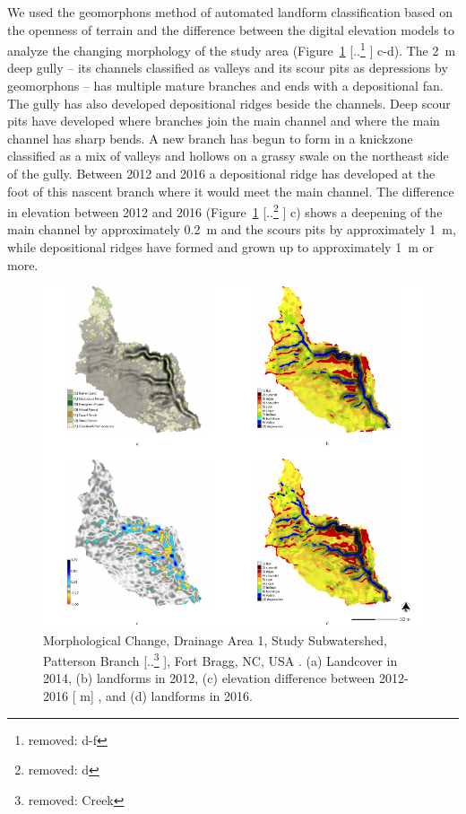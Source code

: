 \documentclass[gmd, manuscript]{copernicus}
\providecommand{\DIFadd}[1]{{\protect\color{blue} \sf #1}} %
\providecommand{\DIFdel}[1]{{\protect\color{red} [..\footnote{removed: #1} ]}} %
\providecommand{\DIFaddbegin}{} %
\providecommand{\DIFaddend}{} %
\providecommand{\DIFdelbegin}{} %
\providecommand{\DIFdelend}{} %
\providecommand{\DIFaddFL}[1]{\DIFadd{#1}} %
\providecommand{\DIFdelFL}[1]{\DIFdel{#1}} %
\providecommand{\DIFaddbeginFL}{} %
\providecommand{\DIFaddendFL}{} %
\providecommand{\DIFdelbeginFL}{} %
\providecommand{\DIFdelendFL}{} %
\begin{document}
We used the geomorphons method 
of automated landform classification
based on the openness of terrain \citep{Jasiewicz2013}
and the difference between the digital elevation models 
to analyze the changing morphology of the study area
(Figure~\ref{fig:study_area}\DIFdelbegin \DIFdel{d-f}\DIFdelend \DIFaddbegin \DIFadd{c-d}\DIFaddend ). 
%
The 2~\unit{m} deep gully -- 
its channels classified as valleys and 
its scour pits as depressions by geomorphons -- 
has multiple mature branches
and ends with a depositional fan.
%
The gully has also developed 
depositional ridges beside the channels.
Deep scour pits have developed 
where branches join the main channel 
and where the main channel has sharp bends.
%
A new branch has begun to form 
in a knickzone classified as a mix of valleys and hollows
on a grassy swale on the northeast side of the gully.
Between 2012 and 2016 a depositional ridge
has developed at the foot of this nascent branch
where it would meet the main channel. 
%
The difference in elevation between 2012 and 2016
(Figure~\ref{fig:study_area}\DIFdelbegin \DIFdel{d}\DIFdelend \DIFaddbegin \DIFadd{c}\DIFaddend )
shows a deepening of the main channel 
by approximately 0.2~\unit{m} 
and the scours pits
by approximately 1~\unit{m},
while depositional ridges have formed and grown up to
approximately 1~\unit{m} or more.

\begin{figure}
\center
\includegraphics[width=\textwidth,height=0.95\textheight,keepaspectratio]{figures/study_area.pdf}
\caption{\DIFaddbeginFL \DIFaddFL{Morphological Change, Drainage Area 1, Study }\DIFaddendFL Subwatershed, Patterson Branch\DIFdelbeginFL \DIFdelFL{Creek}\DIFdelendFL , Fort Bragg, NC, USA\DIFaddbeginFL \DIFaddFL{.
(a) Landcover in 2014, 
(b) landforms in 2012,
(c) elevation difference between 2012-2016 }[\DIFaddFL{m}]\DIFaddFL{, and
(d) landforms in 2016.
}\DIFaddendFL }
\label{fig:study_area}
\end{figure}
\end{document}
